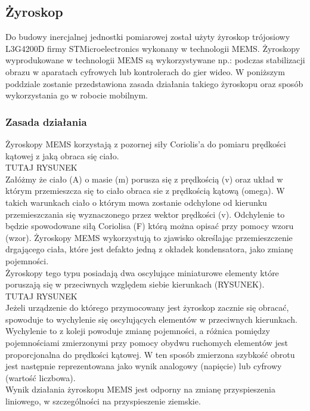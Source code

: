 \subsection{Żyroskop}
Do budowy inercjalnej jednostki pomiarowej został użyty żyroskop trójosiowy L3G4200D firmy STMicroelectronics wykonany w
technologii MEMS. Żyroskopy wyprodukowane w technologii MEMS są wykorzystywane np.: podczas stabilizacji obrazu w aparatach 
cyfrowych lub kontrolerach do gier wideo. W poniższym poddziale zostanie przedstawiona zasada działania takiego żyroskopu
oraz sposób wykorzystania go w robocie mobilnym.

\subsubsection{Zasada działania}
Żyroskopy MEMS korzystają z pozornej siły Coriolis'a do pomiaru prędkości kątowej z jaką obraca się ciało.
\\
TUTAJ RYSUNEK
\\
Załóżmy że ciało (A) o masie (m) porusza się z prędkością (v) oraz układ w którym przemieszcza się to ciało obraca sie 
z prędkością kątową (omega). W takich warunkach ciało o którym mowa zostanie odchylone od kierunku przemieszczania się 
wyznaczonego przez wektor prędkości (v). Odchylenie to będzie spowodowane siłą Coriolisa (F) którą można opisać przy 
pomocy wzoru (wzor). Żyroskopy MEMS wykorzystują to zjawisko określając przemieszczenie drgającego ciała, które jest
defakto jedną z okładek kondensatora, jako zmianę pojemności.
\\
Żyroskopy tego typu posiadają dwa oscylujące miniaturowe elementy które poruszają się w przeciwnych względem
siebie kierunkach (RYSUNEK). 
\\
TUTAJ RYSUNEK
\\
Jeżeli urządzenie do którego przymocowany jest żyroskop zacznie się obracać, spowoduje to
wychylenie się oscylujących elementów w przeciwnych kierunkach. Wychylenie to z koleji powoduje zmianę pojemności, a
różnica pomiędzy pojemnościami zmierzonymi przy pomocy obydwu ruchomych elementów jest proporcjonalna do prędkości
kątowej. W ten sposób zmierzona szybkość obrotu jest następnie reprezentowana jako wynik analogowy (napięcie) lub cyfrowy
(wartość liczbowa).
\\
Wynik działania żyroskopu MEMS jest odporny na zmianę przyspieszenia liniowego, w szczególności na przyspieszenie ziemskie.
